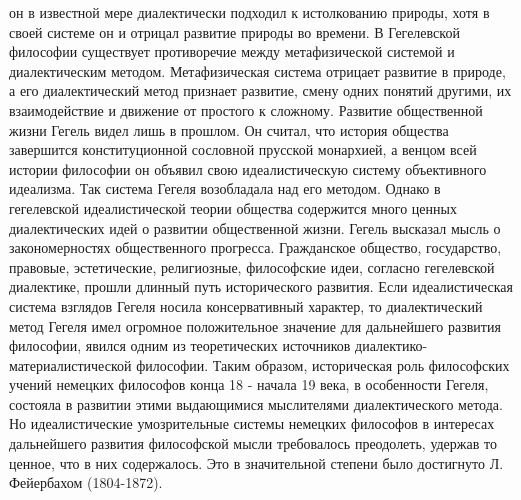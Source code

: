 \documentclass[12pt]{article}
\begin{document}
он в известной мере диалектически подходил к истолкованию природы, хотя в своей системе он и отрицал
развитие природы во времени.
В  Гегелевской  философии  существует  противоречие  между  метафизической  системой  и  диалектическим
методом. Метафизическая система отрицает развитие в природе, а его диалектический метод признает развитие,
смену одних понятий другими, их взаимодействие и движение от простого к сложному.
Развитие общественной жизни Гегель видел лишь в прошлом. Он считал, что история общества завершится
конституционной  сословной  прусской  монархией,  а  венцом  всей  истории  философии  он  объявил  свою
идеалистическую систему объективного идеализма.
Так система Гегеля возобладала над его методом. Однако в гегелевской идеалистической теории общества
содержится много ценных диалектических идей о развитии общественной жизни. Гегель высказал мысль о
закономерностях  общественного  прогресса.  Гражданское  общество,  государство,  правовые,  эстетические,
религиозные,  философские  идеи,  согласно  гегелевской  диалектике,  прошли  длинный  путь  исторического
развития.
Если  идеалистическая  система  взглядов  Гегеля носила  консервативный  характер, то  диалектический метод
Гегеля  имел  огромное  положительное  значение  для  дальнейшего  развития  философии,  явился  одним  из
теоретических источников диалектико-материалистической философии.
Таким образом, историческая роль философских учений немецких философов конца 18 - начала 19 века, в
особенности  Гегеля,  состояла  в  развитии  этими  выдающимися  мыслителями  диалектического  метода.  Но
идеалистические  умозрительные  системы  немецких  философов  в  интересах  дальнейшего  развития
философской мысли требовалось преодолеть, удержав то ценное, что в них содержалось. Это в значительной
степени было достигнуто Л. Фейербахом (1804-1872).

\newpage
\end{document}
